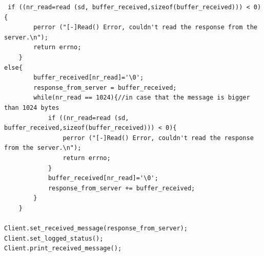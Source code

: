 \documentclass[runningheads]{llncs}
\begin{document}
\begin{verbatim}
 if ((nr_read=read (sd, buffer_received,sizeof(buffer_received))) < 0){
        perror ("[-]Read() Error, couldn't read the response from the server.\n");
        return errno;
    }
else{
        buffer_received[nr_read]='\0';
        response_from_server = buffer_received;
        while(nr_read == 1024){//in case that the message is bigger than 1024 bytes
            if ((nr_read=read (sd, buffer_received,sizeof(buffer_received))) < 0){
                perror ("[-]Read() Error, couldn't read the response from the server.\n");
                return errno;
            }
            buffer_received[nr_read]='\0';
            response_from_server += buffer_received;
        }
    }

Client.set_received_message(response_from_server);
Client.set_logged_status();
Client.print_received_message();
\end{verbatim}
\end{document}
